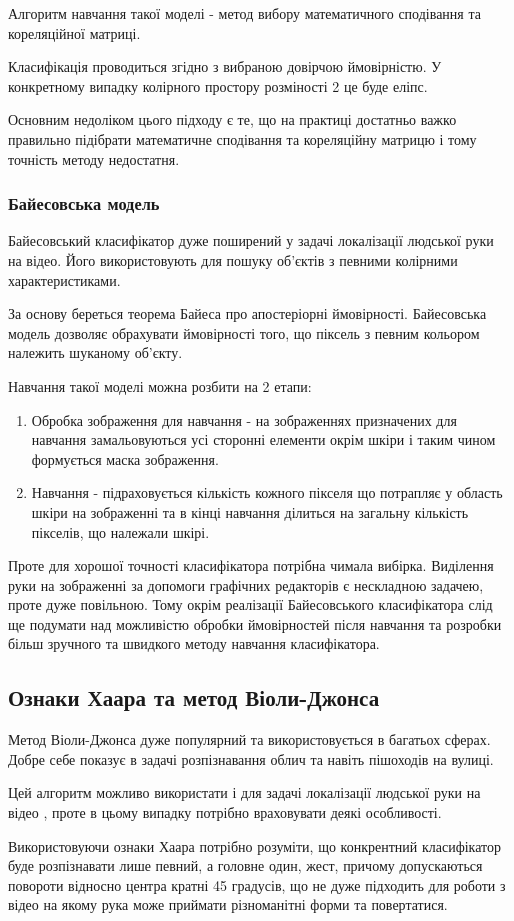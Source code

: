 Алгоритм навчання такої моделі - метод вибору математичного сподівання та кореляційної матриці.

Класифікація проводиться згідно з вибраною довірчою ймовірністю. У конкретному випадку колірного простору розміності 2 це буде еліпс.

Основним недоліком цього підходу є те, що на практиці достатньо важко правильно підібрати математичне сподівання та кореляційну матрицю і тому точність методу недостатня.

\subsubsection{Байесовська модель}

Байесовський класифікатор дуже поширений у задачі локалізації людської руки на відео. Його використовують для пошуку об'єктів з певними колірними характеристиками.

За основу береться теорема Байеса про апостеріорні ймовірності. Байесовська модель дозволяє обрахувати ймовірності того, що піксель з певним кольором належить шуканому об'єкту.

Навчання такої моделі можна розбити на 2 етапи:
\begin{enumerate}
	\item Обробка зображення для навчання - на зображеннях призначених для навчання замальовуються усі сторонні елементи окрім шкіри і таким чином формується маска зображення.
	\item Навчання - підраховується кількість кожного пікселя що потрапляє у область шкіри на зображенні та в кінці навчання ділиться на загальну кількість пікселів, що належали шкірі.
\end{enumerate}

Проте для хорошої точності класифікатора потрібна чимала вибірка. Виділення руки на зображенні за допомоги графічних редакторів є нескладною задачею, проте дуже повільною. Тому окрім реалізації Байесовського класифікатора слід ще подумати над можливістю обробки ймовірностей після навчання та розробки більш зручного та швидкого методу навчання класифікатора.

\subsection{Ознаки Хаара та метод Віоли-Джонса}

Метод Віоли-Джонса дуже популярний та використовується в багатьох сферах. Добре себе показує в задачі розпізнавання облич та навіть пішоходів на вулиці.

Цей алгоритм можливо використати і для задачі локалізації людської руки на відео \cite{VioleJonesRussian} \cite{VioleJonesRussian2}, проте в цьому випадку потрібно враховувати деякі особливості.

Використовуючи ознаки Хаара потрібно розуміти, що конкрентний класифікатор буде розпізнавати лише певний, а головне один, жест, причому допускаються повороти відносно центра кратні 45 градусів, що не дуже підходить для роботи з відео на якому рука може приймати різноманітні форми та повертатися.